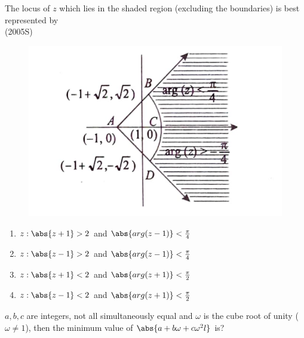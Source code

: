 	\item The locus of $z$ which lies in the shaded region (excluding the boundaries) is best represented by
\\

\hfill{(2005S)}\\
		
	        \begin{figure}[ht]
\includegraphics[scale=0.2]{Figure/fig.png}
		\end{figure}
	
\begin{enumerate}
\item $z:\abs{z+1}>2$ and  $\abs{arg(z-1)}<\frac{\pi}{4}$
\item $z:\abs{z-1}>2$ and $\abs{arg(z-1)}<\frac{\pi}{4}$
\item $z:\abs{z+1}<2$ and $\abs{arg(z+1)}<\frac{\pi}{2}$
\item $z:\abs{z-1}<2$ and $\abs{arg(z+1)}<\frac{\pi}{2}$
\end{enumerate}

\item $a,b,c$ are integers, not all simultaneously equal and $\omega$ is the cube root of unity ($\omega \neq 1$), then the minimum value of $\abs{a+b\omega+c\omega^{2}l}$ is?         \\

